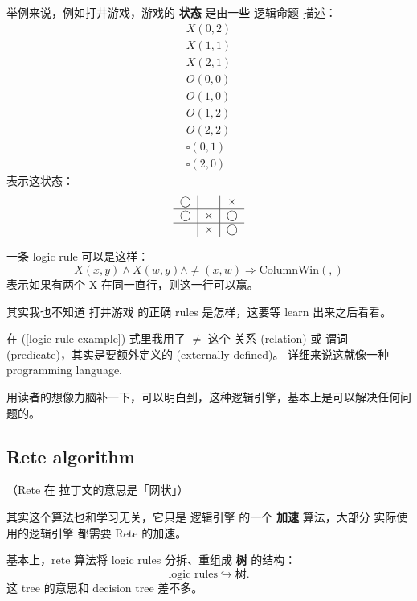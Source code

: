 举例来说，例如打井游戏，游戏的 \textbf{状态} 是由一些 逻辑命题 描述： 
\begin{eqnarray}
	X(0,2) \nonumber \\
	X(1,1) \nonumber \\
	X(2,1) \nonumber \\
	O(0,0) \nonumber \\
	O(1,0) \nonumber \\
	O(1,2) \nonumber \\
	O(2,2) \nonumber \\
	\square(0,1) \nonumber \\
	\square(2,0)
\end{eqnarray}
表示这状态：
\begin{equation}
\begin{tabular}{c|c|c}
$\bigcirc$ &          & $\times$ \\
\hline
$\bigcirc$ & $\times$ & $\bigcirc$ \\
\hline
           & $\times$ & $\bigcirc$ 
\end{tabular}
\end{equation}

一条 logic rule 可以是这样：
\begin{equation}
\label{logic-rule-example}
X(x, y) \wedge X(w, y) \wedge \neq(x,w) \Rightarrow \text{ColumnWin}(,)
\end{equation}
表示如果有两个 X 在同一直行，则这一行可以赢。

其实我也不知道 打井游戏 的正确 rules 是怎样，这要等 learn 出来之后看看。 

在 (\ref{logic-rule-example}) 式里我用了 $\neq$ 这个 关系 (relation) 或 谓词 (predicate)，其实是要额外定义的 (externally defined)。 详细来说这就像一种 programming language.

用读者的想像力脑补一下，可以明白到，这种逻辑引擎，基本上是可以解决任何问题的。 

\subsection{Rete algorithm}

（Rete 在 拉丁文的意思是「网状」）

其实这个算法也和学习无关，它只是 逻辑引擎 的一个 \textbf{加速} 算法，大部分 实际使用的逻辑引擎 都需要 Rete 的加速。

基本上，rete 算法将 logic rules 分拆、重组成 \textbf{树} 的结构：
\begin{equation}
\boxed{\text{logic rules}} \hookrightarrow \boxed{\text{树}} .
\end{equation}
这 tree 的意思和 decision tree 差不多。

